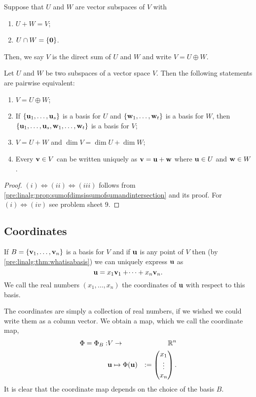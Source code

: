\documentclass[10pt, a4paper]{article}
\begin{document}
\begin{definition}
    Suppose that $U$ and $W$ are vector subspaces of $V$ with
    \begin{enumerate}[label = (\roman*)]
        \item $U + W = V$;
        \item $U \cap W = \{\mathbf{0}\}$.
    \end{enumerate}
    Then,
    we say $V$ is the direct sum of $U$ and $W$ and write $V = U \oplus W$.
\end{definition}

\begin{proposition}
    Let $U$ and $W$ be two subspaces of a vector space $V$.
    Then the following statements are pairwise equivalent:
    \begin{enumerate}[label = (\roman*)]
        \item $V = U \oplus W$;
        \item If $\{\mathbf{u}_1, \dotsc, \mathbf{u}_s\}$ is a basis for $U$ and $\{\mathbf{w}_1, \dotsc, \mathbf{w}_t\}$ is a basis for $W$,
        then $\{\mathbf{u}_1, \dotsc, \mathbf{u}_s, \mathbf{w}_1, \dotsc, \mathbf{w}_t\}$ is a basis for $V$;
        \item $V = U + W$ and $\dim{V} = \dim{U} + \dim{W}$;
        \item Every $\mathbf{v} \in V$ can be written uniquely as $\mathbf{v} = \mathbf{u} + \mathbf{w}$ where $\mathbf{u} \in U$ and $\mathbf{w} \in W$.
    \end{enumerate}
    \begin{proof}
        $(i) \iff (ii) \iff (iii)$ follows from \autoref{pre:linalg:prop:sumofdimsissumofsumandintersection} and its proof.
        For $(i) \iff (iv)$ see problem sheet $9$.
    \end{proof}
\end{proposition}

\subsection{Coordinates}
If $B = \{\mathbf{v}_1, \dotsc, \mathbf{v}_n\}$ is a basis for $V$ and if $\mathbf{u}$ is any point of $V$ then
(by \autoref{pre:linalg:thm:whatisabasis})
we can uniquely express $\mathbf{u}$ as
\[
\mathbf{u} = x_1\mathbf{v}_1 + \dotsi + x_n\mathbf{v}_n.
\]
We call the real numbers $(x_1, \dotsc, x_n)$ the coordinates of $\mathbf{u}$ with respect to this basis.

The coordinates are simply a collection of real numbers,
if we wished we could write them as a column vector.
We obtain a map,
which we call the coordinate map,
\begin{align*}
    \Phi = \Phi_B : &V \rightarrow &\mathbb{R} ^ n \\
    &\mathbf{u} \mapsto \Phi(\mathbf{u}) &:=\begin{pmatrix}
        x_1 \\ \vdots \\ x_n
    \end{pmatrix}.
\end{align*}
It is clear that the coordinate map depends on the choice of the basis $B$.
\end{document}
